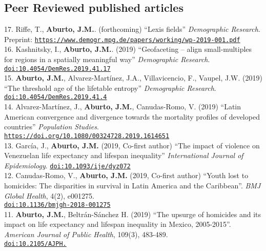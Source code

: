 \documentclass[12pt]{article}
\providecommand*\url[1]{\href{#1}{#1}}
\renewcommand*\url[1]{\href{#1}{\texttt{#1}}}
\begin{document}
\subsection*{Peer Reviewed published articles}
17. Riffe, T., \textbf{Aburto, J.M.}. (forthcoming) ``Lexis fields'' \textit{Demographic Research}. \\ 
Preprint: \url{https://www.demogr.mpg.de/papers/working/wp-2019-001.pdf} \\

16. Kashnitsky, I., \textbf{Aburto, J.M.}. (2019) ``Geofaceting – align small-multiples for regions in a spatially meaningful way'' \textit{Demographic Research}. \url{doi:10.4054/DemRes.2019.41.17}\\

15. \textbf{Aburto, J.M.}, Alvarez-Mart\'inez, J.A., Villavicencio, F., Vaupel, J.W. (2019) ``The threshold age of the lifetable entropy''  \textit{Demographic Research}. \url{doi:10.4054/DemRes.2019.41.4}\\

14. Alvarez-Mart\'inez, J., \textbf{Aburto, J.M.}, Canudas-Romo, V. (2019) ``Latin American convergence and divergence towards the mortality profiles of developed countries''\textit{ Population Studies}.\\ \url{https://doi.org/10.1080/00324728.2019.1614651} \\
  
13. Garc\'ia, J., \textbf{Aburto, J.M.} (2019, Co-first author) ``The impact of violence on Venezuelan life expectancy and lifespan inequality''  \textit{International Journal of Epidemiology}. \url{doi:10.1093/ije/dyz072}\\

12. Canudas-Romo, V., \textbf{Aburto, J.M.} (2019, Co-first author) ``Youth lost to homicides: The disparities in survival in Latin America and the Caribbean''. \textit{BMJ Global Health}, 4(2), e001275. \\ \url{doi:10.1136/bmjgh-2018-001275}\\

11. \textbf{Aburto, J.M.}, Beltr\'an-S\'anchez H. (2019) ``The upsurge of homicides and its impact on life expectancy and lifespan inequality in Mexico, 2005-2015''. \textit{ American Journal of Public Health}, 109(3), 483-489. \\ \url{doi:10.2105/AJPH.}\\
 
\end{document}
